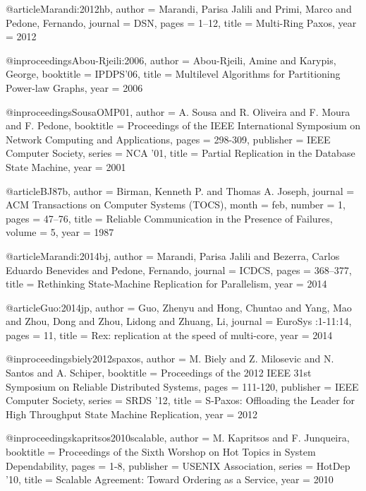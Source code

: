 @article{Marandi:2012hb,
  author  = {Marandi, Parisa Jalili and Primi, Marco and Pedone, Fernando},
  journal = {DSN},
  pages   = {1--12},
  title   = {{Multi-Ring Paxos}},
  year    = {2012}
}

@inproceedings{Abou-Rjeili:2006,
  author    = {Abou-Rjeili, Amine and Karypis, George},
  booktitle = {IPDPS'06},
  title     = {Multilevel Algorithms for Partitioning Power-law Graphs},
  year      = {2006}
}

@inproceedings{SousaOMP01,
  author    = {A. Sousa and R. Oliveira and F. Moura and F. Pedone},
  booktitle = {Proceedings of the IEEE International Symposium on Network Computing and Applications},
  pages     = {298-309},
  publisher = {{IEEE} Computer Society},
  series    = {NCA '01},
  title     = {Partial Replication in the Database State Machine},
  year      = {2001}
}

@article{BJ87b,
  author  = {Birman, Kenneth P. and Thomas A. Joseph},
  journal = {ACM Transactions on Computer Systems (TOCS)},
  month   = {feb},
  number  = {1},
  pages   = {47--76},
  title   = {Reliable Communication in the Presence of Failures},
  volume  = {5},
  year    = {1987}
}

@article{Marandi:2014bj,
  author  = {Marandi, Parisa Jalili and Bezerra, Carlos Eduardo Benevides and Pedone, Fernando},
  journal = {ICDCS},
  pages   = {368--377},
  title   = {{Rethinking State-Machine Replication for Parallelism}},
  year    = {2014}
}

@article{Guo:2014jp,
  author  = {Guo, Zhenyu and Hong, Chuntao and Yang, Mao and Zhou, Dong and Zhou, Lidong and Zhuang, Li},
  journal = {EuroSys :1-11:14},
  pages   = {11},
  title   = {{Rex: replication at the speed of multi-core}},
  year    = {2014}
}

@inproceedings{biely2012spaxos,
  author    = {M. Biely and Z. Milosevic and N. Santos and A. Schiper},
  booktitle = {Proceedings of the 2012 IEEE 31st Symposium on Reliable Distributed Systems},
  pages     = {111-120},
  publisher = {{IEEE} Computer Society},
  series    = {SRDS '12},
  title     = {{S-Paxos}: Offloading the Leader for High Throughput State Machine Replication},
  year      = {2012}
}

@inproceedings{kapritsos2010scalable,
  author    = {M. Kapritsos and F. Junqueira},
  booktitle = {Proceedings of the Sixth Worshop on Hot Topics in System Dependability},
  pages     = {1-8},
  publisher = {{USENIX} Association},
  series    = {HotDep '10},
  title     = {Scalable Agreement: Toward Ordering as a Service},
  year      = {2010}
}

